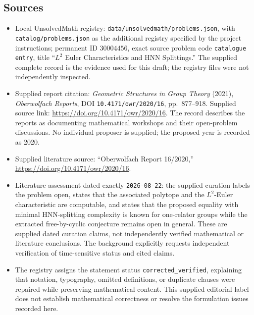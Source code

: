 \documentclass[11pt]{article}
\begin{document}
\subsection{Sources}
\begin{itemize}
\item Local UnsolvedMath registry: \texttt{data/unsolvedmath/problems.json}, with \texttt{catalog/problems.json} as the additional registry specified by the project instructions; permanent ID \(30004456\), exact source problem code \texttt{catalogue entry}, title ``\(L^2\) Euler Characteristics and HNN Splittings.'' The supplied complete record is the evidence used for this draft; the registry files were not independently inspected.
\item Supplied report citation: \emph{Geometric Structures in Group Theory} (2021), \emph{Oberwolfach Reports}, DOI \texttt{10.4171/owr/2020/16}, pp.\ 877--918. Supplied source link: \url{https://doi.org/10.4171/owr/2020/16}. The record describes the reports as documenting mathematical workshops and their open-problem discussions. No individual proposer is supplied; the proposed year is recorded as 2020.
\item Supplied literature source: ``Oberwolfach Report 16/2020,'' \url{https://doi.org/10.4171/owr/2020/16}.
\item Literature assessment dated exactly \texttt{2026-08-22}: the supplied curation labels the problem open, states that the associated polytope and the \(L^2\)-Euler characteristic are computable, and states that the proposed equality with minimal HNN-splitting complexity is known for one-relator groups while the extracted free-by-cyclic conjecture remains open in general. These are supplied dated curation claims, not independently verified mathematical or literature conclusions. The background explicitly requests independent verification of time-sensitive status and cited claims.
\item The registry assigns the statement status \texttt{corrected\_verified}, explaining that notation, typography, omitted definitions, or duplicate clauses were repaired while preserving mathematical content. This supplied editorial label does not establish mathematical correctness or resolve the formulation issues recorded here.
\end{itemize}
\end{document}

